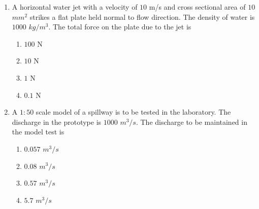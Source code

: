 \documentclass[journal,12pt,onecolumn]{IEEEtran}
\theoremstyle{remark}
\begin{document}
\begin{enumerate}[start=35]
\begin{enumerate}
		  \end{enumerate}
	  \item A horizontal water jet with a velocity of $10$ m/s and cross sectional area of $10$ $mm^2$ strikes a flat plate held normal to flow direction. The density of water is $1000$ $kg/m^3$. The total force on the plate due to the jet is
		  \begin{enumerate}
			  \item $100$ N
			  \item $10$ N
			  \item $1$ N
			  \item $0.1$ N\\
		  \end{enumerate}
	  \item A $1:50$ scale model of a spillway is to be tested in the laboratory. The discharge in the prototype is $1000$ $m^3/s$. The discharge to be maintained in the model test is
		  \begin{enumerate}
			  \item $0.057$ $m^3/s$
			  \item $0.08$ $m^3/s$
			  \item $0.57$ $m^3/s$
			  \item $5.7$ $m^3/s$
		  \end{enumerate}




\end{enumerate}
\end{document}
